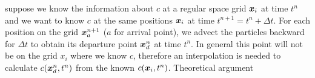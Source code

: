 \documentclass[11pt,letterpaper]{article}
\begin{document}
suppose we know the information about $c$ at a regular space grid $\boldsymbol{x}_i$ at time $t^{n}$ and we want to know $c$ at the same positions $\boldsymbol{x}_i$ at time $t^{n+1} = t^n+\Delta t$. For each position on the grid $\boldsymbol{x}_a^{n+1}$ ($a$ for arrival point), we advect the particles backward for $\Delta t$ to obtain its departure point $\boldsymbol{x}_d^n$ at time $t^n$. In general this point will not be on the grid $x_i$ where we know $c$, therefore an interpolation is needed to calculate $c(\boldsymbol{x}_d^n,t^n)$ from the known $c(\boldsymbol{x}_i,t^n)$. Theoretical argument 


\newpage


\end{document}
